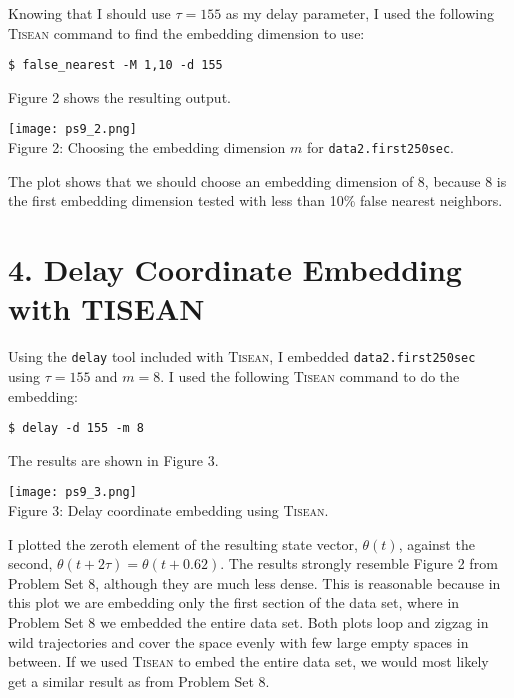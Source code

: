 \documentclass[12pt, letterpaper]{article}
\begin{document}
Knowing that I should use $\tau=155$ as my delay parameter, I used the following
\textsc{Tisean} command to find the embedding dimension to use:

\vspace{1em}
\texttt{\$ false\_nearest -M 1,10 -d 155}
\vspace{1em}

Figure 2 shows the resulting output.

\begin{center}
\texttt{[image: ps9\_2.png]}
\\
Figure 2: Choosing the embedding dimension $m$ for \texttt{data2.first250sec}.
\end{center}

The plot shows that we should choose an embedding dimension of 8, because 8 is 
the first embedding dimension tested with less than 10\% false nearest neighbors.

\section*{4. Delay Coordinate Embedding with TISEAN}

Using the \texttt{delay} tool included with \textsc{Tisean}, I embedded 
\texttt{data2.first250sec} using $\tau=155$ and $m=8$. I used the following
\textsc{Tisean} command to do the embedding:

\vspace{1em}
\texttt{\$ delay -d 155 -m 8}
\vspace{1em}

The results are shown in Figure 3.

\begin{center}
\texttt{[image: ps9\_3.png]}
\\
Figure 3: Delay coordinate embedding using \textsc{Tisean}.
\end{center}

I plotted the zeroth element of the resulting state vector, $\theta(t)$, against
the second, \newline$\theta(t+2\tau) = \theta(t+0.62)$. The results strongly 
resemble Figure 2 from Problem Set 8, although they are much less dense. This is 
reasonable because in this plot we are embedding only the first section of the 
data set, where in Problem Set 8 we embedded the entire data set. Both plots 
loop and zigzag in wild trajectories and cover the space evenly with few large
empty spaces in between. If we used \textsc{Tisean} to embed the entire data
set, we would most likely get a similar result as from Problem Set 8.
\end{document}
